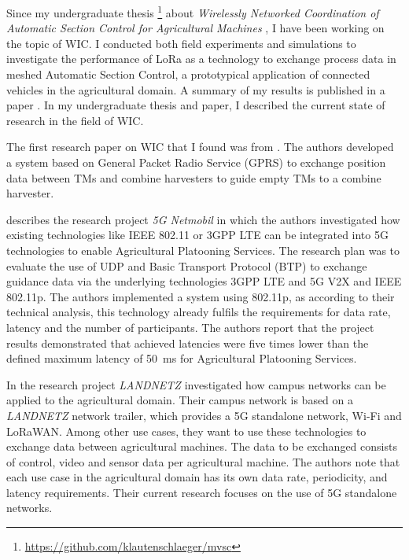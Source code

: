 Since my undergraduate thesis \footnote{\url{https://github.com/klautenschlaeger/mvsc}} about \textit{
Wirelessly Networked Coordination of Automatic Section Control for Agricultural Machines}
, I have been working on the topic of \ac{WIC}. I conducted both field experiments and
simulations to investigate the performance of LoRa as a technology to exchange process data in
meshed Automatic Section Control, a prototypical application of connected vehicles in the agricultural domain.
A summary of my results is published in a paper \cite{lautenschlaeger_beyond_2022}.
In my undergraduate thesis and paper, I described the current state of research in the field of WIC.

The first research paper on WIC that I found was from \textcite{ali_multi-agent_2010}. The authors
developed a system based on General Packet Radio Service (GPRS) to exchange position data between \acp{TM} and combine
harvesters to guide empty \acp{TM} to a combine harvester.

\textcite{smolnik_5g_2020} describes the research project \textit{5G Netmobil} in which the authors investigated how existing technologies like
IEEE 802.11 or 3GPP LTE can be integrated into 5G technologies to enable Agricultural Platooning Services. The research plan was to evaluate the use of \ac{UDP} and Basic Transport Protocol (BTP) to exchange guidance data via
the underlying technologies 3GPP LTE and 5G V2X and IEEE 802.11p. The authors implemented a system using 802.11p,
as according to their technical analysis, this technology already fulfils the requirements for data rate, latency
and the number of participants. The authors report that the project results demonstrated that achieved
latencies were five times lower than the defined maximum latency of \SI{50}{\milli\second} for Agricultural Platooning Services.

In the research project \textit{LANDNETZ} \textcite{hecker_aspects_2022} investigated how campus networks can be applied to the
agricultural domain.
Their campus network is based on a \textit{LANDNETZ} network trailer, which provides a 5G standalone network,
Wi-Fi and LoRaWAN.
Among other use cases, they want to use these technologies to exchange data between agricultural machines.
The data to be exchanged consists of control, video and sensor data per agricultural machine.
The authors note that each use case in the agricultural domain has its own data rate, periodicity,
and latency requirements.
Their current research focuses on the use of 5G standalone networks.


